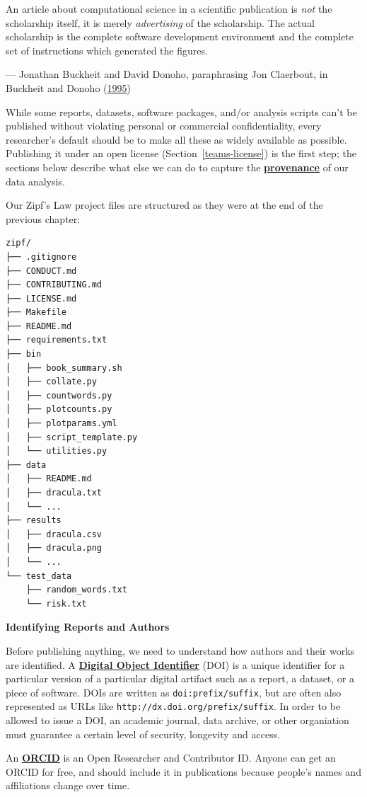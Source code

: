 \documentclass[
]{krantz}
\renewenvironment{quote}{\begin{VF}}{\end{VF}}
\newcommand{\gref}[2]{\hyperlink{#2}{\textbf{#1}}}
\begin{document}
\begin{quote}
An article about computational science in a scientific publication
is \emph{not} the scholarship itself,
it is merely \emph{advertising} of the scholarship.
The actual scholarship is the complete software development environment
and the complete set of instructions which generated the figures.

--- Jonathan Buckheit and David Donoho, paraphrasing Jon Claerbout, in Buckheit and Donoho (\protect\hyperlink{ref-Buck1995}{1995})
\end{quote}

While some reports, datasets, software packages, and/or analysis scripts
can't be published without violating personal or commercial confidentiality,
every researcher's default should be to make all these as widely available as possible.
Publishing it under an open license (Section~\ref{teams-license}) is the first step;
the sections below describe what else we can do to capture
the \gref{provenance}{provenance} of our data analysis.

Our Zipf's Law project files are structured as they were at the end of the previous chapter:

\begin{verbatim}
zipf/
├── .gitignore
├── CONDUCT.md
├── CONTRIBUTING.md
├── LICENSE.md
├── Makefile
├── README.md
├── requirements.txt
├── bin
│   ├── book_summary.sh
│   ├── collate.py
│   ├── countwords.py
│   ├── plotcounts.py
│   ├── plotparams.yml
│   ├── script_template.py
│   └── utilities.py
├── data
│   ├── README.md
│   ├── dracula.txt
│   └── ...
├── results
│   ├── dracula.csv
│   ├── dracula.png
│   └── ...
└── test_data
    ├── random_words.txt
    └── risk.txt
\end{verbatim}

\begin{quote}
\textbf{Identifying Reports and Authors}

Before publishing anything,
we need to understand how authors and their works are identified.
A \gref{Digital Object Identifier}{doi} (DOI)
is a unique identifier for a particular version of a particular digital artifact
such as a report, a dataset, or a piece of software.
DOIs are written as \texttt{doi:prefix/suffix},
but are often also represented as URLs like \texttt{http://dx.doi.org/prefix/suffix}.
In order to be allowed to issue a DOI,
an academic journal, data archive, or other organiation
must guarantee a certain level of security, longevity and access.

An \gref{ORCID}{orcid}
is an Open Researcher and Contributor ID.
Anyone can get an ORCID for free,
and should include it in publications
because people's names and affiliations change over time.
\end{quote}
\end{document}
